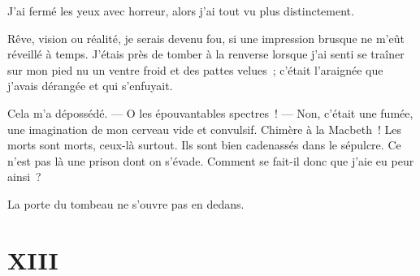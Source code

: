 \documentclass[french,twoside]{book} %
\begin{document}
J’ai fermé les yeux avec horreur, alors j’ai tout vu plus distinctement.\par
Rêve, vision ou réalité, je serais devenu fou, si une impression brusque ne m’eût réveillé à temps.  J’étais près de tomber à la renverse lorsque j’ai senti se traîner sur mon pied nu un ventre froid et des pattes velues ; c’était l’araignée que j’avais dérangée et qui s’enfuyait.\par
Cela m’a dépossédé. — O les épouvantables spectres ! — Non, c’était une fumée, une imagination de mon cerveau vide et convulsif. Chimère à la Macbeth ! Les morts sont morts, ceux-là surtout. Ils sont bien cadenassés dans le sépulcre. Ce n’est pas là une prison dont on s’évade. Comment se fait-il donc que j’aie eu peur ainsi ?\par
La porte du tombeau ne s’ouvre pas en dedans.
 \section[{XIII}]{XIII}
\label{ch13}\renewcommand{\leftmark}{XIII}
\end{document}
